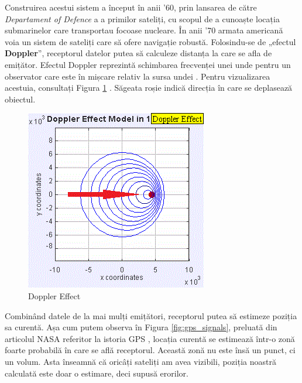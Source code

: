 \documentclass[12pt, a4paper, oneside]{article}
\begin{document}
Construirea acestui sistem a început în anii '60, prin lansarea de către \textit{Departament of Defence} a a primilor sateliți, cu scopul de a cunoaște locația submarinelor care transportau focoase nucleare. În anii '70
armata americană voia un sistem de sateliți care să ofere navigație robustă. Folosindu-se de „efectul \textbf{Doppler}”, receptorul datelor putea să calculeze distanța la care se afla de emițător. Efectul Doppler reprezintă schimbarea frecvenței unei unde pentru un observator care este în mișcare relativ la sursa undei \cite{DopplerEffectWikipedia}. Pentru vizualizarea acestuia, consultați Figura \ref{fig:doppler_effect_moving_object} \cite{DopplerEffectWikipedia}. Săgeata roșie indică direcția în care se deplasează obiectul.

\begin{figure}[h]
\centering
\includegraphics[scale=1]{figures/doppler_effect_moving_object.png}
\caption{Doppler Effect}
\label{fig:doppler_effect_moving_object}
\end{figure}

Combinând datele de la mai mulți emițători, receptorul putea să estimeze poziția sa curentă. Așa cum putem observa în Figura \ref{fig:gps_signals}, preluată din articolul NASA referitor la istoria GPS \cite{GPSHistoryNASA}, locația curentă se estimează într-o zonă foarte probabilă în care se află receptorul. Această zonă nu este însă un punct, ci un volum. Asta înseamnă că oricâți sateliți am avea vizibili, poziția noastră calculată este doar o estimare, deci supusă erorilor.
\end{document}
